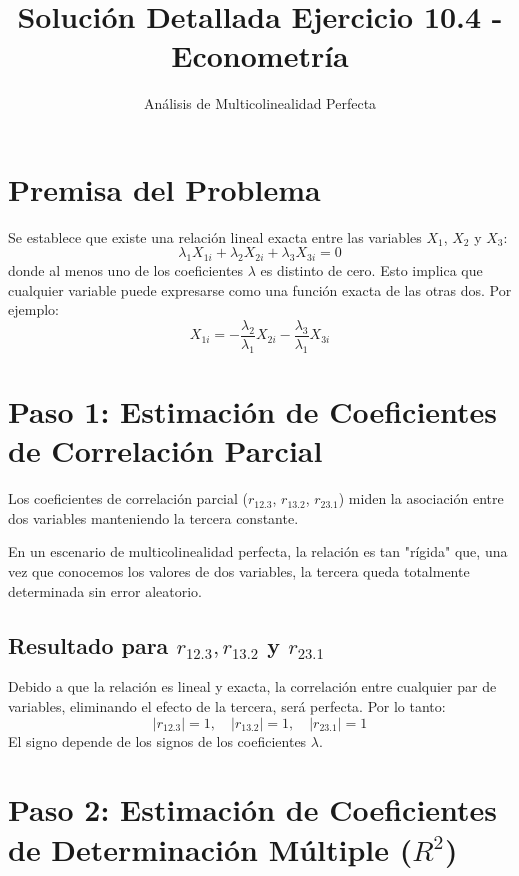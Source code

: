 \documentclass{article}
\title{Solución Detallada Ejercicio 10.4 - Econometría}
\author{Análisis de Multicolinealidad Perfecta}
\date{}
\begin{document}
\maketitle

\section{Premisa del Problema}
Se establece que existe una relación lineal exacta entre las variables $X_1$, $X_2$ y $X_3$:
\begin{equation}
\lambda_1 X_{1i} + \lambda_2 X_{2i} + \lambda_3 X_{3i} = 0
\end{equation}
donde al menos uno de los coeficientes $\lambda$ es distinto de cero. Esto implica que cualquier variable puede expresarse como una función exacta de las otras dos. Por ejemplo:
\begin{equation}
X_{1i} = -\frac{\lambda_2}{\lambda_1}X_{2i} - \frac{\lambda_3}{\lambda_1}X_{3i}
\end{equation}

\section{Paso 1: Estimación de Coeficientes de Correlación Parcial}

Los coeficientes de correlación parcial ($r_{12.3}$, $r_{13.2}$, $r_{23.1}$) miden la asociación entre dos variables manteniendo la tercera constante.

En un escenario de multicolinealidad perfecta, la relación es tan "rígida" que, una vez que conocemos los valores de dos variables, la tercera queda totalmente determinada sin error aleatorio.

\subsection{Resultado para $r_{12.3}, r_{13.2}$ y $r_{23.1}$}
Debido a que la relación es lineal y exacta, la correlación entre cualquier par de variables, eliminando el efecto de la tercera, será perfecta. Por lo tanto:
\begin{equation}
|r_{12.3}| = 1, \quad |r_{13.2}| = 1, \quad |r_{23.1}| = 1
\end{equation}
El signo depende de los signos de los coeficientes $\lambda$.

\section{Paso 2: Estimación de Coeficientes de Determinación Múltiple ($R^2$)}
\end{document}
